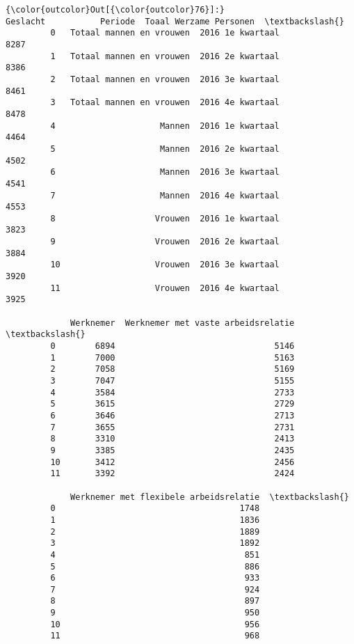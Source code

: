 \documentclass[11pt]{article}
\begin{document}
            \begin{Verbatim}[commandchars=\\\{\}]
{\color{outcolor}Out[{\color{outcolor}76}]:}                     Geslacht           Periode  Toaal Werzame Personen  \textbackslash{}
         0   Totaal mannen en vrouwen  2016 1e kwartaal                    8287   
         1   Totaal mannen en vrouwen  2016 2e kwartaal                    8386   
         2   Totaal mannen en vrouwen  2016 3e kwartaal                    8461   
         3   Totaal mannen en vrouwen  2016 4e kwartaal                    8478   
         4                     Mannen  2016 1e kwartaal                    4464   
         5                     Mannen  2016 2e kwartaal                    4502   
         6                     Mannen  2016 3e kwartaal                    4541   
         7                     Mannen  2016 4e kwartaal                    4553   
         8                    Vrouwen  2016 1e kwartaal                    3823   
         9                    Vrouwen  2016 2e kwartaal                    3884   
         10                   Vrouwen  2016 3e kwartaal                    3920   
         11                   Vrouwen  2016 4e kwartaal                    3925   
         
             Werknemer  Werknemer met vaste arbeidsrelatie  \textbackslash{}
         0        6894                                5146   
         1        7000                                5163   
         2        7058                                5169   
         3        7047                                5155   
         4        3584                                2733   
         5        3615                                2729   
         6        3646                                2713   
         7        3655                                2731   
         8        3310                                2413   
         9        3385                                2435   
         10       3412                                2456   
         11       3392                                2424   
         
             Werknemer met flexibele arbeidsrelatie  \textbackslash{}
         0                                     1748   
         1                                     1836   
         2                                     1889   
         3                                     1892   
         4                                      851   
         5                                      886   
         6                                      933   
         7                                      924   
         8                                      897   
         9                                      950   
         10                                     956   
         11                                     968   
         

\end{Verbatim}
\end{document}
